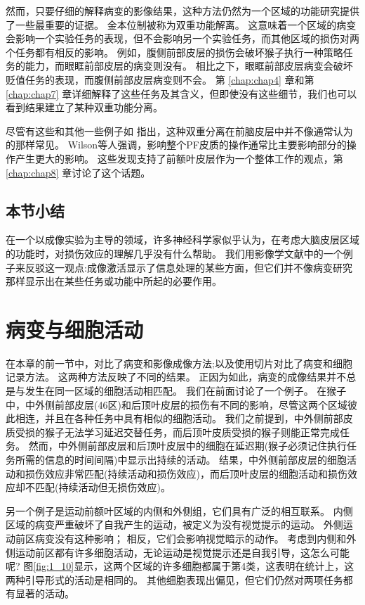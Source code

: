 \par
然而，只要仔细的解释病变的影像结果，这种方法仍然为一个区域的功能研究提供了一些最重要的证据。
金本位制被称为双重功能解离。
这意味着一个区域的病变会影响一个实验任务的表现，但不会影响另一个实验任务，而其他区域的损伤对两个任务都有相反的影响。
例如，腹侧前部皮层的损伤会破坏猴子执行一种策略任务的能力\cite{baxter2009ventrolateral}，而眼眶前部皮层的病变则没有\cite{baxter2007asymmetry,baxter2007orbital}。
相比之下，眼眶前部皮层病变会破坏贬值任务的表现\cite{izquierdo2004bilateral}，而腹侧前部皮层病变则不会\cite{baxter2009ventrolateral}。
第 \ref{chap:chap4} 章和第 \ref{chap:chap7} 章详细解释了这些任务及其含义，但即使没有这些细节，我们也可以看到结果建立了某种双重功能分离。

\par
尽管有这些和其他一些例子如 \cite{gaffan2002interaction}指出，这种双重分离在前脑皮层中并不像通常认为的那样常见。
Wilson等人\cite{wilson2010functional}强调，影响整个PF皮质的操作通常比主要影响部分的操作产生更大的影响。
这些发现支持了前额叶皮层作为一个整体工作的观点，第 \ref{chap:chap8} 章讨论了这个话题。

\subsection{本节小结}
在一个以成像实验为主导的领域，许多神经科学家似乎认为，在考虑大脑皮层区域的功能时，对损伤效应的理解几乎没有什么帮助。
我们用影像学文献中的一个例子来反驳这一观点:成像激活显示了信息处理的某些方面，但它们并不像病变研究那样显示出在某些任务或功能中所起的必要作用。


\section{病变与细胞活动}
在本章的前一节中，对比了病变和影像成像方法;以及使用切片对比了病变和细胞记录方法。
这两种方法反映了不同的结果。
正因为如此，病变的成像结果并不总是与发生在同一区域的细胞活动相匹配。
我们在前面讨论了一个例子。
在猴子中，中外侧前部皮层(46区)和后顶叶皮层的损伤有不同的影响，尽管这两个区域彼此相连，并且在各种任务中具有相似的细胞活动。
我们之前提到，中外侧前部皮质受损的猴子无法学习延迟交替任务，而后顶叶皮质受损的猴子则能正常完成任务。
然而，中外侧前部皮层\cite{KOJIMA1984229}和后顶叶皮层\cite{chafee1998matching}中的细胞在延迟期(猴子必须记住执行任务所需的信息的时间间隔)中显示出持续的活动。
结果，中外侧前部皮层的细胞活动和损伤效应非常匹配(持续活动和损伤效应)，而后顶叶皮层的细胞活动和损伤效应却不匹配(持续活动但无损伤效应)。

\par
另一个例子是运动前额叶区域的内侧和外侧组，它们具有广泛的相互联系\cite{luppino1993corticocortical}。
内侧区域的病变严重破坏了自我产生的运动，被定义为没有视觉提示的运动。
外侧运动前区病变没有这种影响\cite{thaler1995functions}；
相反，它们会影响视觉暗示的动作。
考虑到内侧和外侧运动前区都有许多细胞活动，无论运动是视觉提示还是自我引导，这怎么可能呢?
图\ref{fig:1_10}显示，这两个区域的许多细胞都属于第4类，这表明在统计上，这两种引导形式的活动是相同的。
其他细胞表现出偏见，但它们仍然对两项任务都有显著的活动。

